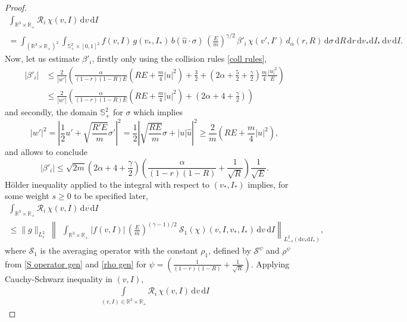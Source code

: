 \documentclass[11pt,a4paper]{amsart}
\newcommand{\bRp}{\mathbb{R}_+}
\newcommand{\bRfp}{\mathbb{R}^3 \times \bRp}
\newcommand{\bSp}{\mathbb{S}^2_+}
\newcommand{\mS}{\mathcal{S}}
\newcommand{\md}{\mathrm{d}}
\newcommand{\dpo}{d_\alpha(r,R)}
\newcommand{\g}{\gamma}
\newcommand{\E}{\left(\frac{E}{m}\right)}
\newcommand{\kk}{\beta}
\newcommand{\domparam}{\bSp \times [0,1]^2}
\newcommand{\iallintro}{\int_{(\bRfp)^2}\int_{\domparam}}
\newcommand{\dall}{ \md \sigma \, \md R \, \md r \, \md v_* \md I_* \, \md v \, \md I}
\newcommand{\R}{\mathcal{R}}
\begin{document}
\begin{proof}
  	\begin{multline*}
  \int_{ \bRfp }	\R_i \, \chi(v,I) \, \md v \, \md I 
  \\ =\iallintro  f(v,I) \, g(v_*,I_*)   \,   b(\hat{u}\cdot\sigma) \, \E^{\g/2} \, \kk'_i \, \chi(v',I')  \, \dpo  \, 	\dall.
  \end{multline*}
Now, let us estimate $\kk'_i$, firstly only using the collision rules \eqref{coll rules},
\begin{equation*}
	\begin{split}
	|\kk'_i| &\leq  \frac{2 }{|w'|} \left(  \frac{\alpha}{ (1-r)(1-R)E } \left(R E + \frac{m}{4}|u|^2\right)  + \frac{3}{2} + \left( 2 \alpha +\frac{5}{2} + \frac{\g}{2} \right) \frac{m}{4} \frac{|u|^2}{E}   \right)
	\\
& 	\leq  \frac{2 }{|w'|} \left(  \frac{ \alpha }{ (1-r)(1-R)E } \left(R E + \frac{m}{4}|u|^2\right)  + \left( 2 \alpha + 4 + \frac{\g}{2} \right) \right)
	\end{split}
\end{equation*}
and secondly, the domain $\bSp$ for $\sigma$ which implies 
\begin{equation*}
|w'|^2 = \left| \frac{1}{2} u' + \sqrt{\frac{R'E}{m}}\sigma' \right|^2  = \frac{1}{2}  \left|\sqrt{\frac{RE}{m}} \sigma + |u| \hat{u} \right|^2 \geq \frac{2}{m} \left(RE + \frac{m}{4}|u|^2\right),
\end{equation*}
and allows to conclude
\begin{equation*}
	|\kk'_i| \leq  \sqrt{2 m} \left(2\alpha + 4 + \frac{\g}{2}\right)  \left(  \frac{\alpha}{ (1-r)(1-R) }  + \frac{1}{\sqrt{R}}\right) \frac{1}{\sqrt{E}}.
\end{equation*}
H\"older inequality applied to the integral with respect to $(v_*,I_*)$ implies, for some weight $s\geq0$ to be specified later,
	\begin{multline*}
	\int_{ \bRfp }	\R_i \, \chi(v,I) \, \md v \, \md I 
	\\ \leq
	\| g \|_{L^2_s} \ \left\| \ \  \int_{\bRfp}   |f(v,I)|    \,  \E^{(\g-1)/2} \ \mS_1(\chi)(v,I, v_*, I_*) \,\md v \,\md I \right\|_{L^2_{-s}(\md v_* \md I_*)},
\end{multline*}
where $\mS_1$  is the averaging operator with the constant $\rho_1$,  defined by $\mS^\psi$ and $\rho^\psi$  from   \eqref{S operator gen} and \eqref{rho gen} for $\psi = \left( \frac{1}{(1-r)(1-R)} + \frac{1}{\sqrt{R}}\right)$.
Applying Cauchy-Schwarz  inequality in $(v,I)$,
	\begin{multline*}
	\int\limits_{(v,I)\in \bRfp }	\R_i \, \chi(v,I) \, \md v \, \md I 

\end{multline*}
\end{proof}
\end{document}
